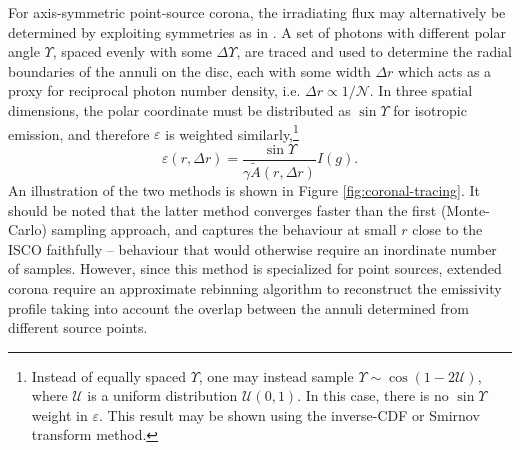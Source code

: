 \documentclass[fleqn,usenatbib]{mnras}
\begin{document}
For axis-symmetric point-source corona, the irradiating flux may alternatively
be determined by exploiting symmetries as in \cite{dauser_irradiation_2013}. A
set of photons with different polar angle $\Upsilon$, spaced evenly with some
$\Delta \Upsilon$, are traced and used to determine the radial boundaries of the
annuli on the disc, each with some width $\Delta r$ which acts as a proxy for
reciprocal photon number density, i.e. $\Delta r \propto 1 / \mathcal{N}$. In
three spatial dimensions, the polar coordinate must be distributed as $\sin
\Upsilon$ for isotropic emission, and therefore $\varepsilon$ is weighted
similarly,\footnote{Instead of equally spaced $\Upsilon$, one may instead sample
$\Upsilon \sim \cos (1 - 2 \mathcal{U})$, where $\mathcal{U}$ is a uniform
distribution $\mathcal{U}(0,1)$. In this case, there is no $\sin \Upsilon$
weight in $\varepsilon$. This result may be shown using the inverse-CDF or
Smirnov transform method.}
\begin{equation}
    \varepsilon(r, \Delta r) = \frac{\sin \Upsilon}{\gamma \tilde{A}(r, \Delta r)} I(g).
\end{equation}
An illustration of the two methods is shown in Figure \ref{fig:coronal-tracing}.
It should be noted that the latter method converges faster than the
first (Monte-Carlo) sampling approach, and captures the behaviour at small $r$
close to the ISCO faithfully -- behaviour that would otherwise require an
inordinate number of samples. However, since this method is specialized for
point sources, extended corona require an approximate rebinning algorithm to
reconstruct the emissivity profile taking into account the overlap between the
annuli determined from different source points.
\end{document}

